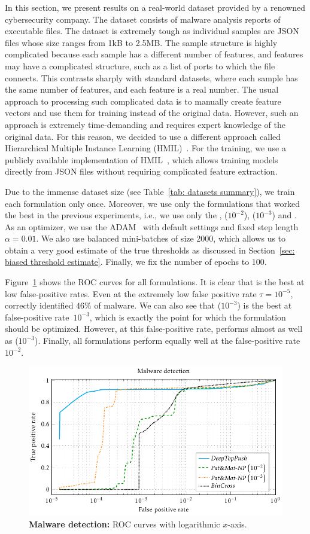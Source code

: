 In this section, we present results on a real-world dataset provided by a renowned cybersecurity company. The dataset consists of malware analysis reports of executable files. The dataset is extremely tough as individual samples are JSON files whose size ranges from 1kB to 2.5MB. The sample structure is highly complicated because each sample has a different number of features, and features may have a complicated structure, such as a list of ports to which the file connects. This contrasts sharply with standard datasets, where each sample has the same number of features, and each feature is a real number. The usual approach to processing such complicated data is to manually create feature vectors and use them for training instead of the original data. However, such an approach is extremely time-demanding and requires expert knowledge of the original data. For this reason, we decided to use a different approach called Hierarchical Multiple Instance Learning (HMIL)~\cite{pevny2017using}. For the training, we use a publicly available implementation of HMIL~\cite{mandlik2021mill}, which allows training models directly from JSON files without requiring complicated feature extraction.

Due to the immense dataset size (see Table~\ref{tab: datasets summary}), we train each formulation only once. Moreover, we use only the formulations that worked the best in the previous experiments, i.e., we use only the \BaseLine, \PatMatNP($10^{-2}$), \PatMatNP($10^{-3}$) and \DeepTopPush. As an optimizer, we use the ADAM~\cite{kingma2014adam} with default settings and fixed step length~$\alpha = 0.01.$ We also use balanced mini-batches of size 2000, which allows us to obtain a very good estimate of the true thresholds as discussed in Section~\ref{sec: biased threshold estimate}. Finally, we fix the number of epochs to 100.

Figure~\ref{fig: malware detection} shows the ROC curves for all formulations. It is clear that \DeepTopPush is the best at low false-positive rates. Even at the extremely low false positive rate $\tau=10^{-5}$, \DeepTopPush correctly identified $46\%$ of malware. We can also see that \PatMatNP($10^{-3}$) is the best at false-positive rate~$10^{-3}$, which is exactly the point for which the formulation should be optimized. However, at this false-positive rate, \DeepTopPush performs almost as well as \PatMatNP($10^{-3}$). Finally, all formulations perform equally well at the false-positive rate~$10^{-2}$.

\begin{figure}
  \centering
  \includegraphics{images/malware_detection.pdf}
  \caption{\textbf{Malware detection:} ROC curves with logarithmic $x$-axis.}
  \label{fig: malware detection}
\end{figure}
\hfill
